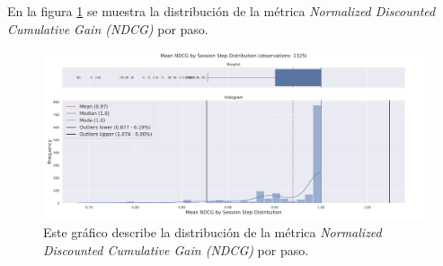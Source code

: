 \documentclass[11pt,a4paper,twoside]{thesis}
\begin{document}
\clearpage


En la figura \ref{fig:llama3-mean_ndcg_by_session_step_distribution} se muestra la distribución de la métrica \textit{Normalized Discounted Cumulative Gain (NDCG)} por paso.

\begin{figure}[H]
	\centering
	\includegraphics[width=15cm]{./images/llama3/mean_ndcg_by_session_step_distribution.png}
	\caption{Este gráfico describe la distribución de la métrica \textit{Normalized Discounted Cumulative Gain (NDCG)}  por paso.
	}
	\label{fig:llama3-mean_ndcg_by_session_step_distribution}
\end{figure}
\end{document}
